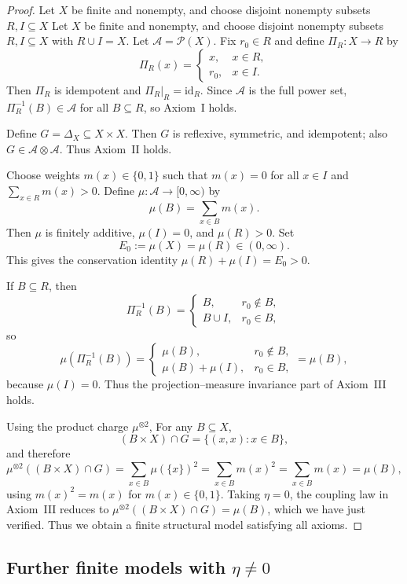 \documentclass[11pt]{article}
\numberwithin{equation}{section}
\theoremstyle{definition}
\begin{document}
\begin{proof}
Let $X$ be finite and nonempty, and choose disjoint nonempty subsets $R,I\subseteq X$
Let $X$ be finite and nonempty, and choose disjoint nonempty subsets $R,I\subseteq X$
with $R\cup I = X$.
Let $\mathcal A=\mathcal P(X)$.
Fix $r_0\in R$ and define $\Pi_R:X\to R$ by
\[
\Pi_R(x)=
\begin{cases}
x, & x\in R,\\
r_0, & x\in I.
\end{cases}
\]
Then $\Pi_R$ is idempotent and $\Pi_R|_R=\mathrm{id}_R$.
Since $\mathcal A$ is the full power set, $\Pi_R^{-1}(B)\in\mathcal A$ for all $B\subseteq R$,
so Axiom~I holds.

Define $G=\Delta_X\subseteq X\times X$.
Then $G$ is reflexive, symmetric, and idempotent; also $G\in\mathcal A\otimes\mathcal A$.
Thus Axiom~II holds.

Choose weights $m(x)\in\{0,1\}$ such that $m(x)=0$ for all $x\in I$ and
$\sum_{x\in R} m(x)>0$.
Define $\mu:\mathcal A\to[0,\infty)$ by
\[
\mu(B)=\sum_{x\in B} m(x).
\]
Then $\mu$ is finitely additive, $\mu(I)=0$, and $\mu(R)>0$.
Set
\[
E_0 := \mu(X) = \mu(R) \in (0,\infty).
\]
This gives the conservation identity $\mu(R)+\mu(I)=E_0>0$.

If $B\subseteq R$, then
\[
\Pi_R^{-1}(B) =
\begin{cases}
B, & r_0\notin B,\\
B\cup I, & r_0\in B,
\end{cases}
\]
so
\[
\mu(\Pi_R^{-1}(B))
=
\begin{cases}
\mu(B), & r_0\notin B,\\
\mu(B)+\mu(I), & r_0\in B,
\end{cases}
=
\mu(B),
\]
because $\mu(I)=0$.
Thus the projection--measure invariance part of Axiom~III holds.

Using the product charge $\mu^{\otimes2}$,
For any $B\subseteq X$,
\[
(B\times X)\cap G
= \{(x,x): x\in B\},
\]
and therefore
\[
\mu^{\otimes2}((B\times X)\cap G)
= \sum_{x\in B} \mu(\{x\})^2
= \sum_{x\in B} m(x)^2
= \sum_{x\in B} m(x)
= \mu(B),
\]
using $m(x)^2=m(x)$ for $m(x)\in\{0,1\}$.
Taking $\eta=0$, the coupling law in Axiom~III reduces to
$\mu^{\otimes2}((B\times X)\cap G)=\mu(B)$, which we have just verified.
Thus we obtain a finite structural model satisfying all axioms.
\end{proof}


\subsection{Further finite models with \texorpdfstring{$\eta\neq 0$}{eta ≠ 0}}
\end{document}
